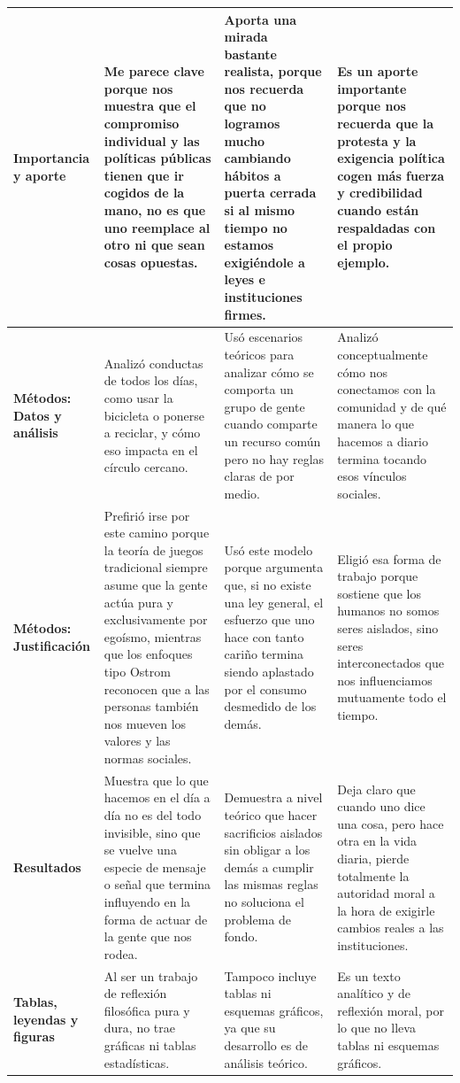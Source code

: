 \documentclass[12pt]{article}
\begin{document}
\begin{longtable}{|>{\raggedright\arraybackslash}p{3cm}|>{\raggedright\arraybackslash}p{4.2cm}|>{\raggedright\arraybackslash}p{4.2cm}|>{\raggedright\arraybackslash}p{4.2cm}|}
\hline
\textbf{Importancia y aporte} & Me parece clave porque nos muestra que el compromiso individual y las políticas públicas tienen que ir cogidos de la mano, no es que uno reemplace al otro ni que sean cosas opuestas. & Aporta una mirada bastante realista, porque nos recuerda que no logramos mucho cambiando hábitos a puerta cerrada si al mismo tiempo no estamos exigiéndole a leyes e instituciones firmes. & Es un aporte importante porque nos recuerda que la protesta y la exigencia política cogen más fuerza y credibilidad cuando están respaldadas con el propio ejemplo. \\
\hline
\textbf{Métodos: Datos y análisis} & Analizó conductas de todos los días, como usar la bicicleta o ponerse a reciclar, y cómo eso impacta en el círculo cercano. & Usó escenarios teóricos para analizar cómo se comporta un grupo de gente cuando comparte un recurso común pero no hay reglas claras de por medio. & Analizó conceptualmente cómo nos conectamos con la comunidad y de qué manera lo que hacemos a diario termina tocando esos vínculos sociales. \\
\hline
\textbf{Métodos: Justificación} & Prefirió irse por este camino porque la teoría de juegos tradicional siempre asume que la gente actúa pura y exclusivamente por egoísmo, mientras que los enfoques tipo Ostrom reconocen que a las personas también nos mueven los valores y las normas sociales. & Usó este modelo porque argumenta que, si no existe una ley general, el esfuerzo que uno hace con tanto cariño termina siendo aplastado por el consumo desmedido de los demás. & Eligió esa forma de trabajo porque sostiene que los humanos no somos seres aislados, sino seres interconectados que nos influenciamos mutuamente todo el tiempo. \\
\hline
\textbf{Resultados} & Muestra que lo que hacemos en el día a día no es del todo invisible, sino que se vuelve una especie de mensaje o señal que termina influyendo en la forma de actuar de la gente que nos rodea. & Demuestra a nivel teórico que hacer sacrificios aislados sin obligar a los demás a cumplir las mismas reglas no soluciona el problema de fondo. & Deja claro que cuando uno dice una cosa, pero hace otra en la vida diaria, pierde totalmente la autoridad moral a la hora de exigirle cambios reales a las instituciones. \\
\hline
\textbf{Tablas, leyendas y figuras} & Al ser un trabajo de reflexión filosófica pura y dura, no trae gráficas ni tablas estadísticas. & Tampoco incluye tablas ni esquemas gráficos, ya que su desarrollo es de análisis teórico. & Es un texto analítico y de reflexión moral, por lo que no lleva tablas ni esquemas gráficos. \\

\end{longtable}
\end{document}
